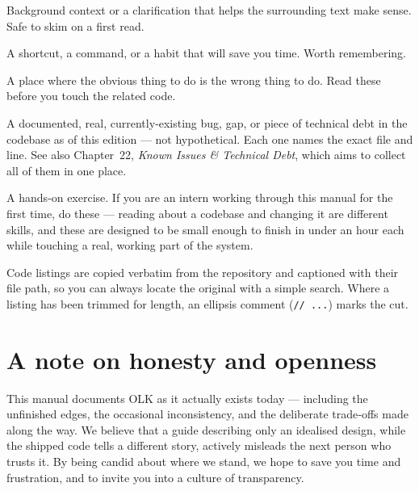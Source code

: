 \begin{olknote}
	Background context or a clarification that helps the surrounding text make sense. Safe to skim on a first read.
\end{olknote}

\begin{olktip}
	A shortcut, a command, or a habit that will save you time. Worth remembering.
\end{olktip}

\begin{olkwarn}
	A place where the obvious thing to do is the wrong thing to do. Read these before you touch the related code.
\end{olkwarn}

\begin{olkgotcha}
	A documented, real, currently‑existing bug, gap, or piece of technical debt in the codebase as of this edition — not hypothetical. Each one names the exact file and line. See also Chapter~22, \emph{Known Issues \& Technical Debt}, which aims to collect all of them in one place.
\end{olkgotcha}

\vspace*{4cm}
\begin{olktask}
	A hands‑on exercise. If you are an intern working through this manual for the first time, do these — reading about a codebase and changing it are different skills, and these are designed to be small enough to finish in under an hour each while touching a real, working part of the system.
\end{olktask}

Code listings are copied verbatim from the repository and captioned with their file path, so you can always locate the original with a simple search. Where a listing has been trimmed for length, an ellipsis comment (\texttt{// ...}) marks the cut.

\section*{A note on honesty and openness}

This manual documents OLK as it actually exists today — including the unfinished edges, the occasional inconsistency, and the deliberate trade‑offs made along the way. We believe that a guide describing only an idealised design, while the shipped code tells a different story, actively misleads the next person who trusts it. By being candid about where we stand, we hope to save you time and frustration, and to invite you into a culture of transparency.

